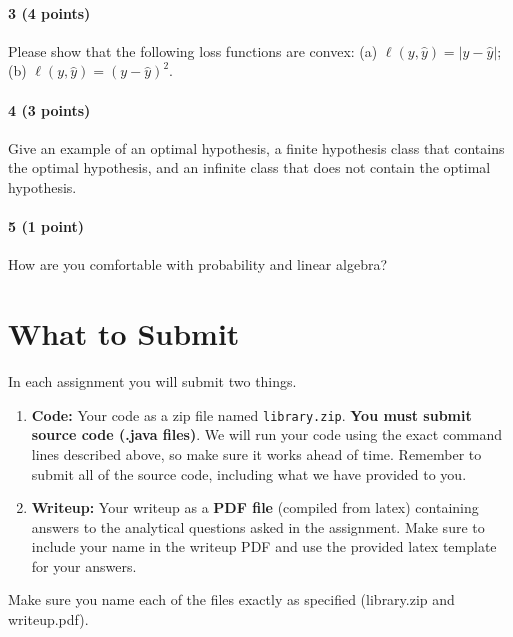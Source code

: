 \documentclass[11pt]{article}
\begin{document}
\paragraph{3 (4 points)} Please show that the following loss functions are convex: (a) $\ell (y, \hat{y}) = |y-\hat{y}|$; (b) $\ell (y, \hat{y}) = (y-\hat{y})^2$.



\paragraph{4 (3 points)} 
Give an example of an optimal hypothesis, a finite hypothesis class that contains the optimal hypothesis, and an infinite class that does not contain the optimal hypothesis.

\paragraph{5 (1 point)}
How are you comfortable with probability and linear algebra?

\section{What to Submit}
In each assignment you will submit two things.
\begin{enumerate}
\item {\bf Code:} Your code as a zip file named {\tt library.zip}. {\bf You must submit source code (.java files)}. We will run your code using the exact command lines described above, so make sure it works ahead of time. Remember to submit all of the source code, including what we have provided to you.
\item {\bf Writeup:} Your writeup as a {\bf PDF file} (compiled from latex) containing answers to the analytical questions asked in the assignment. Make sure to include your name in the writeup PDF and use the provided latex template for your answers.
\end{enumerate}
Make sure you name each of the files exactly as specified (library.zip and writeup.pdf).
\end{document}
